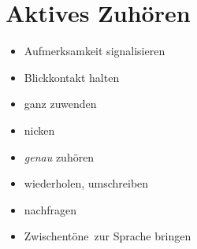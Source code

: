 \section{Aktives Zuhören}
\label{aktives-zuhoeren}

\begin{itemize}
  \item Aufmerksamkeit signalisieren
  \item Blickkontakt halten
  \item ganz zuwenden
  \item nicken
  \item \emph{genau} zuhören
  \item wiederholen, umschreiben
  \item nachfragen
  \item \glqq Zwischentöne\grqq\ zur Sprache bringen
\end{itemize}

